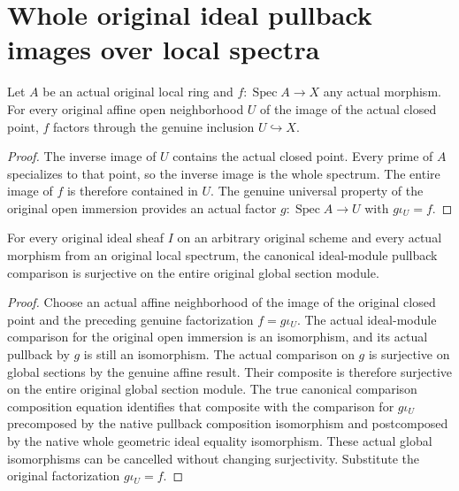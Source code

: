 \section{Whole original ideal pullback images over local spectra}

\begin{lemma}
\label{lem:actual-local-spectrum-affine-factor}
\leanok
Let $A$ be an actual original local ring and
$f:\operatorname{Spec}A\to X$ any actual morphism. For every original
affine open neighborhood $U$ of the image of the actual closed
point, $f$ factors through the genuine inclusion $U\hookrightarrow X$.
\end{lemma}
\begin{proof}
The inverse image of $U$ contains the actual closed point. Every
prime of $A$ specializes to that point, so the inverse image is the
whole spectrum. The entire image of $f$ is therefore contained in
$U$. The genuine universal property of the original open immersion
provides an actual factor $g:\operatorname{Spec}A\to U$ with
$g\iota_U=f$.
\end{proof}

\begin{lemma}
\label{lem:actual-local-spectrum-ideal-pullback-surjective}
\leanok
{}
For every original ideal sheaf $I$ on an arbitrary original scheme
and every actual morphism from an original local spectrum, the
canonical ideal-module pullback comparison is surjective on the
entire original global section module.
\end{lemma}
\begin{proof}
Choose an actual affine neighborhood of the image of the original
closed point and the preceding genuine factorization $f=g\iota_U$.
The actual ideal-module comparison for the original open immersion
is an isomorphism, and its actual pullback by $g$ is still an
isomorphism. The actual comparison on $g$ is surjective on global
sections by the genuine affine result. Their composite is therefore
surjective on the entire original global section module. The true
canonical comparison composition equation identifies that composite
with the comparison for $g\iota_U$ precomposed by the native
pullback composition isomorphism and postcomposed by the native
whole geometric ideal equality isomorphism. These actual global
isomorphisms can be cancelled without changing surjectivity.
Substitute the original factorization $g\iota_U=f$.
\end{proof}

